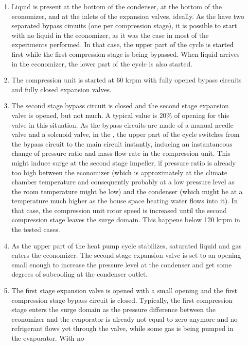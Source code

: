 \begin{enumerate}
\item Liquid is present at the bottom of the condenser, at the bottom
  of the economizer, and at the inlets of the expansion valves,
  ideally. As the \AWP{} have two separated bypass circuits (one per
  compression stage), it is possible to start with no liquid in the
  economizer, as it was the case in most of the experiments
  performed. In that case, the upper part of the cycle is started
  first while the first compression stage is being bypassed. When
  liquid arrives in the economizer, the lower part of the cycle is
  also started.
\item The compression unit is started at 60 krpm with fully opened
  bypass circuits and fully closed expansion valves.
\item The second stage bypass circuit is closed and the second stage
  expansion valve is opened, but not much. A typical value is 20\% of
  opening for this valve in this situation. As the bypass circuits are
  made of a manual needle valve and a solenoid valve, in the \AWP{},
  the upper part of the cycle switches from the bypass circuit to the
  main circuit instantly, inducing an instantaneous change of pressure
  ratio and mass flow rate in the compression unit. This might induce
  surge at the second stage impeller, if pressure ratio is already too
  high between the economizer (which is approximately at the climate
  chamber temperature and consequently probably at a low pressure
  level as the room temperature might be low) and the condenser (which
  might be at a temperature much higher as the house space heating
  water flows into it). In that case, the compression unit rotor speed
  is increased until the second compression stage leaves the surge
  domain. This happens below 120 krpm in the tested cases.
\item As the upper part of the heat pump cycle stabilizes, saturated
  liquid and gas enters the economizer. The second stage expansion
  valve is set to an opening small enough to increase the pressure
  level at the condenser and get some degrees of subcooling at the
  condenser outlet.
\item The first stage expansion valve is opened with a small opening
  and the first compression stage bypass circuit is closed. Typically,
  the first compression stage enters the surge domain as the pressure
  difference between the economizer and the evaporator is already not
  equal to zero anymore and no refrigerant flows yet through the
  valve, while some gas is being pumped in the evaporator. With no

\end{enumerate}
